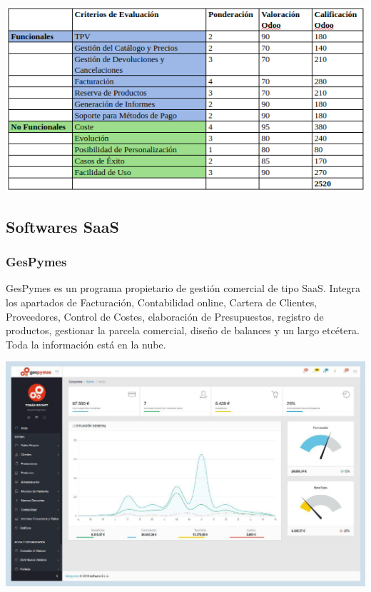 \documentclass{article}
\begin{document}
\begin{flushleft}
	\includegraphics[scale=0.6]{imagenes/EvOdoo.png}
\end{flushleft}

\subsection{Softwares SaaS}

\subsubsection{GesPymes}

GesPymes es un programa propietario de gestión comercial de tipo SaaS.  Integra los apartados de Facturación, Contabilidad online, Cartera de Clientes, Proveedores, Control de Costes, elaboración de Presupuestos, registro de productos, gestionar la parcela comercial, diseño de balances y un largo etcétera. Toda la información está en la nube.

\begin{flushleft}
	\includegraphics[scale=0.25]{imagenes/Gespymes1.jpg} 
\end{flushleft}
\end{document}
